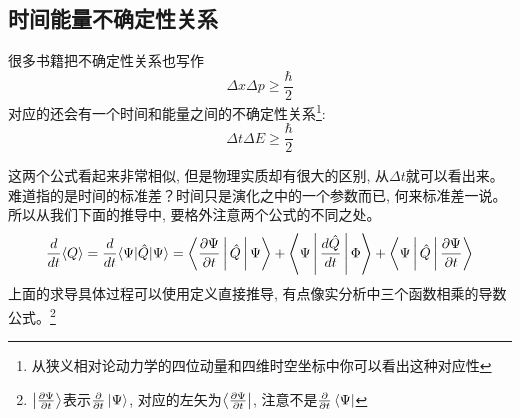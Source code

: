 \documentclass[a4paper,zihao=-4,linespread=1]{ctexrep}
\begin{document}
    \subsection*{时间能量不确定性关系}
    很多书籍把不确定性关系也写作
    \begin{equation}
       \Delta {x} \Delta {p} \ge \frac{\hbar}{{2 }} 
    \end{equation}
    对应的还会有一个时间和能量之间的不确定性关系\footnote{从狭义相对论动力学的四位动量和四维时空坐标中你可以看出这种对应性}:
    \begin{equation}
        \label{E-t}
        \Delta {t} \Delta {E} \ge \frac{\hbar}{{2 }}
    \end{equation}
    
    
    这两个公式看起来非常相似, 但是物理实质却有很大的区别, 从$\Delta t$就可以看出来。难道指的是时间的标准差？时间只是演化之中的一个参数而已, 何来标准差一说。
    所以从我们下面的推导中, 要格外注意两个公式的不同之处。
    \begin{equation}
        \label{求导式子}
        \frac{d}{d t}\langle Q\rangle=\frac{d}{d t}\langle\Psi|\hat{Q}| \Psi\rangle=\Braket{\frac{\partial \Psi}{\partial t}|\hat{Q}| \Psi}+\Braket{\Psi|\frac{d \hat{Q}}{d t}|\Phi}+\Braket{\Psi|\hat{Q}| \frac{\partial \Psi}{\partial t}}
    \end{equation}
    上面的求导具体过程可以使用定义直接推导, 有点像实分析中三个函数相乘的导数公式。\footnote{$\Ket{\frac{\partial \Psi}{\partial t}}$表示$\frac{\partial }{\partial t}\Ket{\Psi}$, 对应的左矢为$\Bra{\frac{\partial \Psi}{\partial t}}$, 注意不是$\frac{\partial }{\partial t}\Bra{\Psi}$}
    
\end{document}
